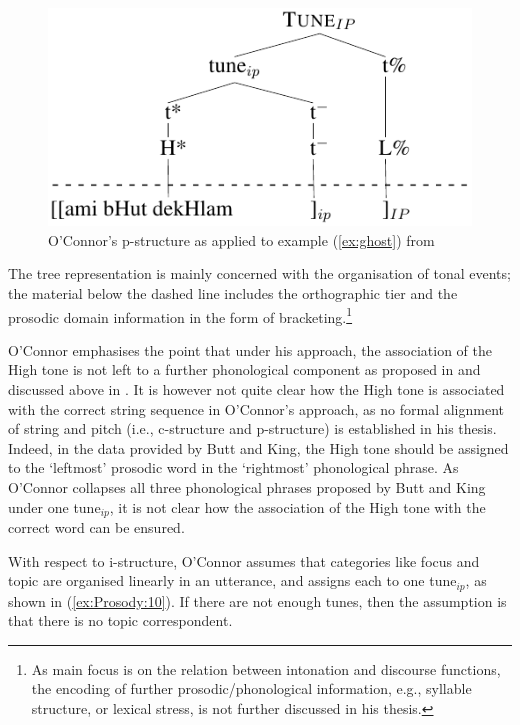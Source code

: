 \documentclass[output=paper,hidelinks]{langscibook}
\begin{document}
\begin{figure}
  \centering
  \includegraphics[width=.55\textwidth]{figures/Prosody/Boegel_Figure_12.pdf}
\caption{O'Connor's p-structure as applied to example (\ref{ex:ghost}) from \citet{buttking98}}
\label{fig:connor}
\end{figure}

The tree representation is mainly concerned with the organisation of tonal events; the material below the dashed line includes the orthographic tier and the prosodic domain information in the form of bracketing.\footnote{As  main focus is on the relation between intonation and discourse functions, the encoding of further prosodic/phonological information, e.g., syllable structure, or lexical stress, is not further discussed in his thesis.}


O'Connor emphasises the point that under his approach, the association of the High tone is not left to a further phonological component as proposed in \citet{buttking98} and discussed above in . It is however not quite clear how the High tone is associated with the correct string sequence in O'Connor's approach, as no formal  alignment of string and pitch (i.e., c-structure and p-structure) is established in his thesis. Indeed, in the data provided by Butt and King, the High tone should be assigned to the `leftmost' prosodic word in the `rightmost' phonological phrase. As O'Connor collapses all three phonological phrases proposed by Butt and King under one tune$_{ip}$, it is not clear how the association of the High tone with the correct word can be ensured.

With respect to i-structure, O'Connor assumes that categories like {\sc focus} and {\sc topic} are organised linearly in an utterance, and assigns each to one tune$_{ip}$, as shown in (\ref{ex:Prosody:10}). If there are not enough tunes, then the assumption is that there is no topic correspondent.

\ea\label{ex:Prosody:10}
\z
\end{document}
